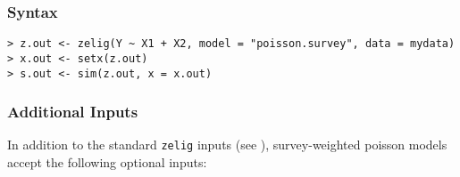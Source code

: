 \subsubsection{Syntax}

\begin{verbatim}
> z.out <- zelig(Y ~ X1 + X2, model = "poisson.survey", data = mydata)
> x.out <- setx(z.out)
> s.out <- sim(z.out, x = x.out)
\end{verbatim}


\subsubsection{Additional Inputs}

In addition to the standard {\tt zelig} inputs (see
), survey-weighted poisson models accept the following
optional inputs:
